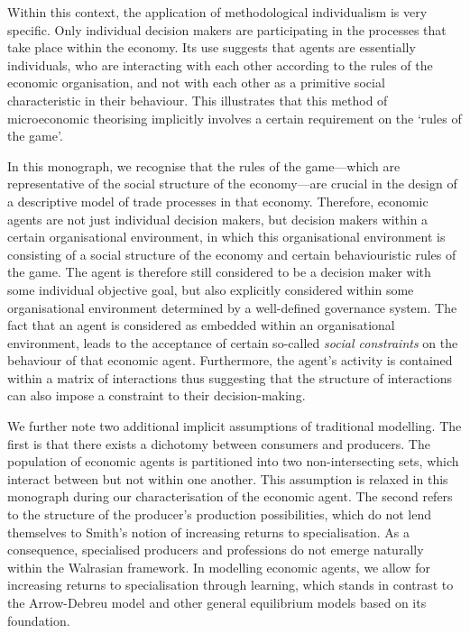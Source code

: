 Within this context, the application of methodological individualism is very specific. Only individual decision makers are participating in the processes that take place within the economy. Its use suggests that agents are essentially individuals, who are interacting with each other according to the rules of the economic organisation, and not with each other as a primitive social characteristic in their behaviour. This illustrates that this method of microeconomic theorising implicitly involves a certain requirement on the `rules of the game'. 

In this monograph, we recognise that the rules of the game---which are representative of the social structure of the economy---are crucial in the design of a descriptive model of trade processes in that economy. Therefore, economic agents are not just individual decision makers, but decision makers within a certain organisational environment, in which this organisational environment is consisting of a social structure of the economy and certain behaviouristic rules of the game. The agent is therefore still considered to be a decision maker with some individual objective goal, but also explicitly considered within some organisational environment determined by a well-defined governance system. The fact that an agent is considered as embedded within an organisational environment, leads to the acceptance of certain so-called \emph{social constraints} on the behaviour of that economic agent. Furthermore, the agent's activity is contained within a matrix of interactions thus suggesting that the structure of interactions can also impose a constraint to their decision-making.

We further note two additional implicit assumptions of traditional modelling. The first is that there exists a dichotomy between consumers and producers. The population of economic agents is partitioned into two non-intersecting sets, which interact between but not within one another. This assumption is relaxed in this monograph during our characterisation of the economic agent. The second refers to the structure of the producer's production possibilities, which do not lend themselves to Smith's notion of increasing returns to specialisation. As a consequence, specialised producers and professions do not emerge naturally within the Walrasian framework. In modelling economic agents, we allow for increasing returns to specialisation through learning, which stands in contrast to the Arrow-Debreu model and other general equilibrium models based on its foundation.

